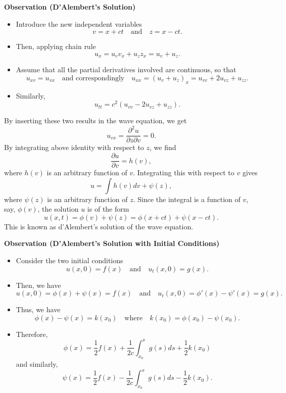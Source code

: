 \documentclass[12pt,openany]{book}
\theoremstyle{definition}
\begin{document}
	\newpage
	
	\textbf{Observation (D'Alembert's Solution)}
	
	\begin{itemize}
		\item Introduce the new independent variables
		\[
		v = x + ct \quad \text{and} \quad z = x - ct.
		\]
		\item Then, applying chain rule
		\[
		u_x = u_v v_x + u_z z_x = u_v + u_z.
		\]
		\item Assume that all the partial derivatives involved are continuous, so that
		\[
		u_{xv} = u_{vx} \quad \text{and correspondingly} \quad u_{xx} = (u_v + u_z)_x = u_{vv} + 2u_{vz} + u_{zz}.
		\]
		\item Similarly,
		\[
		u_{tt} = c^2 (u_{vv} - 2u_{vz} + u_{zz}).
		\]
	\end{itemize}
	
	By inserting these two results in the wave equation, we get
	\[
	u_{vx} = \frac{\partial^2 u}{\partial z \partial v} = 0.
	\]
	By integrating above identity with respect to \( z \), we find
	\[
	\frac{\partial u}{\partial v} = h(v),
	\]
	where \( h(v) \) is an arbitrary function of \( v \). Integrating this with respect to \( v \) gives
	\[
	u = \int h(v) dv + \psi(z),
	\]
	where \( \psi(z) \) is an arbitrary function of \( z \). Since the integral is a function of \( v \), say, \( \phi(v) \), the solution \( u \) is of the form
	\[
	u(x, t) = \phi(v) + \psi(z) = \phi(x + ct) + \psi(x - ct).
	\]
	This is known as d'Alembert's solution of the wave equation.
	
	\textbf{Observation (D'Alembert's Solution with Initial Conditions)}
	
	\begin{itemize}
		\item Consider the two initial conditions
		\[
		u(x, 0) = f(x) \quad \text{and} \quad u_t(x, 0) = g(x).
		\]
		\item Then, we have
		\[
		u(x, 0) = \phi(x) + \psi(x) = f(x) \quad \text{and} \quad u_t(x, 0) = \phi'(x) - \psi'(x) = g(x).
		\]
		\item Thus, we have
		\[
		\phi(x) - \psi(x) = k(x_0) \quad \text{where} \quad k(x_0) = \phi(x_0) - \psi(x_0).
		\]
		\item Therefore,
		\[
		\phi(x) = \frac{1}{2} f(x) + \frac{1}{2c} \int_{x_0}^{x} g(s) ds + \frac{1}{2} k(x_0)
		\]
		and similarly,
		\[
		\psi(x) = \frac{1}{2} f(x) - \frac{1}{2c} \int_{x_0}^{x} g(s) ds - \frac{1}{2} k(x_0).
		\]
	\end{itemize}
	
\end{document}
